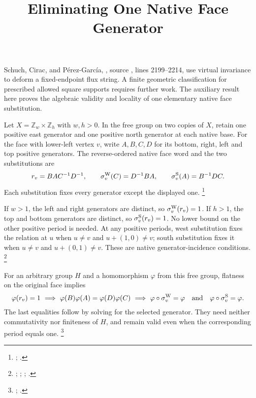 \documentclass{article}
\title{Eliminating One Native Face Generator}
\author{}
\date{}
\begin{document}
\maketitle
{}

Schuch, Cirac, and P\'erez-Garc\'ia, \cite[Lemma~6.14]{Schuch2010PEPS},
source , lines 2199--2214,
use virtual invariance to deform a fixed-endpoint flux string.
A finite geometric classification for prescribed allowed square supports
requires further work. The auxiliary result here proves the algebraic
validity and locality of one elementary native face substitution.

Let $X=\mathbb Z_w\times\mathbb Z_h$ with $w,h>0$. In the free group on two
copies of $X$, retain one positive east generator and one positive north
generator at each native base. For the face with lower-left vertex $v$,
write $A,B,C,D$ for its bottom, right, left and top positive generators.
The reverse-ordered native face word and the two substitutions are
\begin{align}
    r_v=BAC^{-1}D^{-1},\qquad
    \sigma_v^{\rm W}(C)=D^{-1}BA,\qquad
    \sigma_v^{\rm S}(A)=B^{-1}DC.
    \label{eq:scp10_face_elimination_substitutions}
\end{align}
Each substitution fixes every generator except the displayed one.
\footnote{;
.}

If $w>1$, the left and right generators are distinct, so
$\sigma_v^{\rm W}(r_v)=1$. If $h>1$, the top and bottom generators are distinct,
so $\sigma_v^{\rm S}(r_v)=1$. No lower bound on the other positive period
is needed. At any positive periods, west substitution fixes the relation
at $u$ when $u\ne v$ and $u+(1,0)\ne v$; south substitution fixes it when
$u\ne v$ and $u+(0,1)\ne v$. These are native generator-incidence conditions.
\footnote{;
;
;
.}

For an arbitrary group $H$ and a homomorphism $\varphi$ from this free group,
flatness on the original face implies
\begin{align}
    \varphi(r_v)=1
    \ \Longrightarrow\
    \varphi(B)\varphi(A)=\varphi(D)\varphi(C)
    \ \Longrightarrow\
    \varphi\circ\sigma_v^{\rm W}=\varphi
    \quad\hbox{and}\quad
    \varphi\circ\sigma_v^{\rm S}=\varphi.
    \label{eq:scp10_face_elimination_representations}
\end{align}
The last equalities follow by solving for the selected generator.
They need neither commutativity nor finiteness of $H$, and remain valid even
when the corresponding period equals one.
\footnote{;
.}
\end{document}
